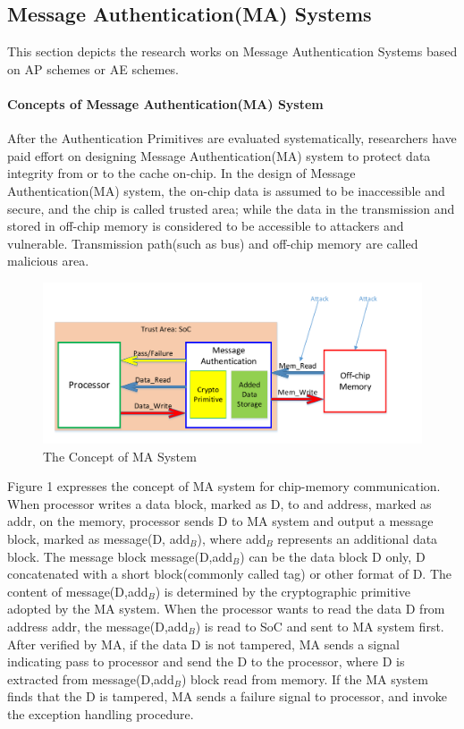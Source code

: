\documentclass{article}
\begin{document}
\subsection{Message Authentication(MA) Systems}
This section depicts the research works on Message Authentication Systems based on AP schemes or AE schemes.
\paragraph{Concepts of Message Authentication(MA) System}
After the Authentication Primitives are evaluated systematically, researchers have paid effort on designing Message Authentication(MA) system to protect data integrity from or to the cache on-chip. 
In the design of Message Authentication(MA) system, the on-chip data is assumed to be inaccessible and secure, and the chip is called trusted area; while the data in the transmission and stored in off-chip memory is considered to be accessible to attackers and vulnerable. Transmission path(such as bus) and off-chip memory are called malicious area. 
\begin{figure}[htbp]
\centering
\includegraphics[scale=0.5]{./diagrams/MA_concept.pdf}
\caption{The Concept of MA System}
\label{ma_system}
\end{figure}

Figure 1 expresses the concept of MA system for chip-memory communication. 
When processor writes a data block, marked as D, to and address, marked as addr, on the memory, processor sends D to MA system and output a message block, marked as message(D, add$_B$), where add$_B$ represents an additional data block. The message block message(D,add$_B$) can be the data block D only, D concatenated with a short block(commonly called tag) or other format of D. The content of message(D,add$_B$) is determined by the cryptographic primitive adopted by the MA system.
When the processor wants to read the data D from address addr, the message(D,add$_B$) is read to SoC and sent to MA system first. After verified by MA, if the data D is not tampered, MA sends a signal indicating pass to processor and send the D to the processor, where D is extracted from message(D,add$_B$) block read from memory.
If the MA system finds that the D is tampered, MA sends a failure signal to processor, and invoke the exception handling procedure.
\end{document}
